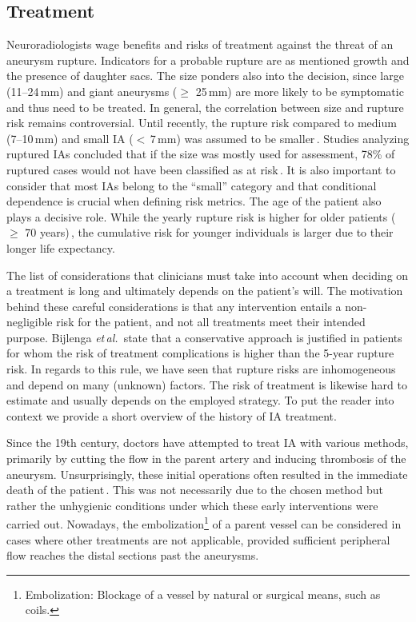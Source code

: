 \subsection{Treatment}
Neuroradiologists wage benefits and risks of treatment against the threat of an aneurysm rupture. Indicators for a probable rupture are as mentioned growth and the presence of daughter sacs. The size ponders also into the decision, since large (11--24\,mm) and giant aneurysms ($\geq$ 25\,mm) are more likely to be symptomatic and thus need to be treated. In general, the correlation between size and rupture risk remains controversial. Until recently, the rupture risk compared to medium (7--10\,mm) and small IA ($<$\,7\,mm) was assumed to be smaller\,\cite{Bijlenga2017}. Studies analyzing ruptured IAs concluded that if the size was mostly used for assessment, 78\% of ruptured cases would not have been classified as at risk\,\cite{Pagiola2020}. It is also important to consider that most IAs belong to the ``small'' category and that conditional dependence is crucial when defining risk metrics. The age of the patient also plays a decisive role. While the yearly rupture risk is higher for older patients ($\geq$ 70 years)\,\cite{Bijlenga2017}, the cumulative risk for younger individuals is larger due to their longer life expectancy.

The list of considerations that clinicians must take into account when deciding on a treatment is long and ultimately depends on the patient's will. The motivation behind these careful considerations is that any intervention entails a non-negligible risk for the patient, and not all treatments meet their intended purpose. Bijlenga \textit{et\,al.}\,\cite{Bijlenga2017} state that a conservative approach is justified in patients for whom the risk of treatment complications is higher than the 5-year rupture risk. In regards to this rule, we have seen that rupture risks are inhomogeneous and depend on many (unknown) factors. The risk of treatment is likewise hard to estimate and usually depends on the employed strategy. To put the reader into context we provide a short overview of the history of IA treatment.

Since the 19th century, doctors have attempted to treat IA with various methods, primarily by cutting the flow in the parent artery and inducing thrombosis of the aneurysm. Unsurprisingly, these initial operations often resulted in the immediate death of the patient\,\cite{Smith1994}. This was not necessarily due to the chosen method but rather the unhygienic conditions under which these early interventions were carried out. Nowadays, the embolization\footnote{Embolization: Blockage of a vessel by natural or surgical means, such as coils.} of a parent vessel can be considered in cases where other treatments are not applicable, provided sufficient peripheral flow reaches the distal sections past the aneurysms.

